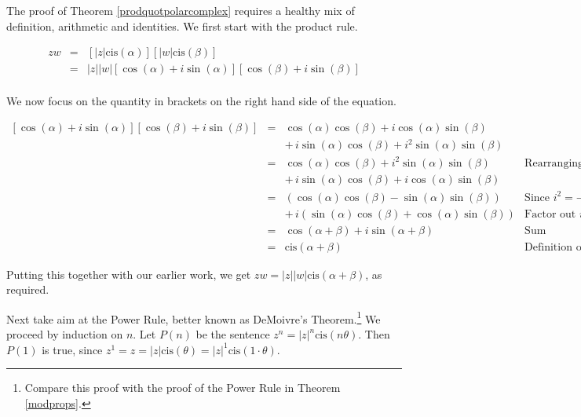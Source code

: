 \documentclass{ximera}
\begin{document}

\medskip

The proof of Theorem \ref{prodquotpolarcomplex} requires a healthy mix of definition, arithmetic and identities.  We first start with the product rule.

\[ \begin{array}{rcl}

zw & = & \left[|z|\text{cis}(\alpha)\right] \left[|w|\text{cis}(\beta)\right]  \\[3pt]
   & = & |z||w|\left[\cos(\alpha) + i\sin(\alpha)\right]\left[\cos(\beta) + i \sin(\beta)\right] \\ \end{array} \]

We now focus on the quantity in brackets on the right hand side of the equation.

\[ \begin{array}{rcll}

\left[\cos(\alpha) + i\sin(\alpha)\right]\left[\cos(\beta) + i \sin(\beta)\right] & = & \cos(\alpha)\cos(\beta) + i\cos(\alpha)\sin(\beta) & \\
																																									&  & + \, i\sin(\alpha)\cos(\beta) + i^2 \sin(\alpha) \sin(\beta) & \\[3pt]
																																									& = & \cos(\alpha)\cos(\beta) +  i^2 \sin(\alpha) \sin(\beta)& \text{Rearranging terms} \\
																																									&  & + \, i\sin(\alpha)\cos(\beta) +i\cos(\alpha)\sin(\beta)  & \\[3pt]
																																									& = & \left(\cos(\alpha)\cos(\beta) - \sin(\alpha) \sin(\beta)\right) & \text{Since $i^2 = -1$}\\
																																									&  & + \, i\left(\sin(\alpha)\cos(\beta)+ \cos(\alpha)\sin(\beta)\right) & \text{Factor out $i$}\\[3pt] 
																																									& = & \cos(\alpha + \beta) + i \sin(\alpha+\beta) & \text{Sum identities} \\[3pt]
																																									& = & \text{cis}(\alpha + \beta) & \text{Definition of `cis'}
\end{array} \]

Putting this together with our earlier work, we get $zw = |z| |w| \text{cis}(\alpha + \beta)$, as required.  

\smallskip

Next take aim at the Power Rule, better known  as DeMoivre's Theorem.\footnote{Compare this proof with the proof of the Power Rule in Theorem \ref{modprops}.} We proceed by induction on $n$. Let $P(n)$ be the sentence $z^{n} = |z|^{n} \text{cis}(n \theta)$.  Then $P(1)$ is true, since $z^{1} = z = |z| \text{cis}(\theta) = |z|^{1} \text{cis}(1\cdot \theta)$.  
\end{document}
